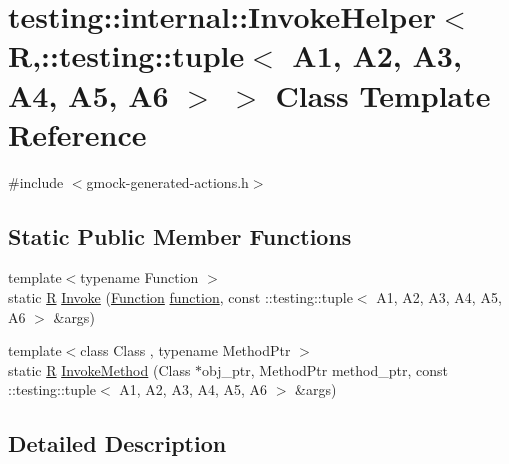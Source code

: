 \hypertarget{classtesting_1_1internal_1_1_invoke_helper_3_01_r_00_1_1testing_1_1tuple_3_01_a1_00_01_a2_00_01_6f3c1b6c3435aa3488b058deeeb8a74f}{}\section{testing\+:\+:internal\+:\+:Invoke\+Helper$<$ R,\+:\+:testing\+:\+:tuple$<$ A1, A2, A3, A4, A5, A6 $>$ $>$ Class Template Reference}
\label{classtesting_1_1internal_1_1_invoke_helper_3_01_r_00_1_1testing_1_1tuple_3_01_a1_00_01_a2_00_01_6f3c1b6c3435aa3488b058deeeb8a74f}


{\ttfamily \#include $<$gmock-\/generated-\/actions.\+h$>$}

\subsection*{Static Public Member Functions}
\begin{DoxyCompactItemize}
\item 
{\footnotesize template$<$typename Function $>$ }\\static \hyperlink{typedefs__9_8js_afb423b73ee7b6c04d2d54fc06e405404}{R} \hyperlink{classtesting_1_1internal_1_1_invoke_helper_3_01_r_00_1_1testing_1_1tuple_3_01_a1_00_01_a2_00_01_6f3c1b6c3435aa3488b058deeeb8a74f_a8025603713729f09a113092f4f2bd0db}{Invoke} (\hyperlink{structtesting_1_1internal_1_1_function}{Function} \hyperlink{_07copy_08_2_undistort_image_8m_aa0b19300b507d475ab9f1525750bc11f}{function}, const \+::testing\+::tuple$<$ A1, A2, A3, A4, A5, A6 $>$ \&args)
\item 
{\footnotesize template$<$class Class , typename Method\+Ptr $>$ }\\static \hyperlink{typedefs__9_8js_afb423b73ee7b6c04d2d54fc06e405404}{R} \hyperlink{classtesting_1_1internal_1_1_invoke_helper_3_01_r_00_1_1testing_1_1tuple_3_01_a1_00_01_a2_00_01_6f3c1b6c3435aa3488b058deeeb8a74f_a2adfff699bce3603b915b339e8e5e993}{Invoke\+Method} (Class $\ast$obj\+\_\+ptr, Method\+Ptr method\+\_\+ptr, const \+::testing\+::tuple$<$ A1, A2, A3, A4, A5, A6 $>$ \&args)
\end{DoxyCompactItemize}


\subsection{Detailed Description}
